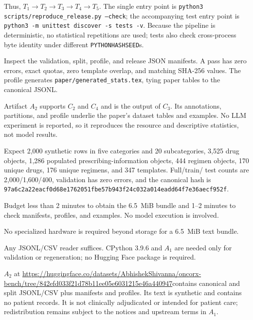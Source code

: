 \documentclass[conference]{IEEEtran}
\newcommand{\DatasetRevision}{\url{https://huggingface.co/datasets/AbhishekShivanna/oncorx-bench/tree/842efd033f21d78b11ee05e6031215e46a440947}}
\newcommand{\ReleaseHashA}{\texttt{97a6c2a22eacf0d68e1762051fbe57b9}}
\newcommand{\ReleaseHashB}{\texttt{43f24c032a014eadd64f7e36aecf952f}}
\begin{document}
Thus, $T_1\rightarrow T_2\rightarrow T_3\rightarrow T_4\rightarrow
T_5$.  The single entry point is
\texttt{python3 scripts/reproduce\_release.py --check}; the accompanying test
entry point is \texttt{python3 -m unittest discover -s tests -v}.  Because the
pipeline is deterministic, no statistical repetitions are used; tests also
check cross-process byte identity under different \texttt{PYTHONHASHSEED}s.

\artout

Inspect the validation, split, profile, and release JSON manifests.  A pass has
zero errors, exact quotas, zero template overlap, and matching SHA-256 values.
The profile generates \texttt{paper/generated\_stats.tex}, tying paper tables
to the canonical JSONL.

\newartifact

\artrel

Artifact $A_2$ supports $C_2$ and $C_4$ and is the output of $C_3$.  Its
annotations, partitions, and profile underlie the paper's dataset tables and
examples.  No LLM experiment is reported, so it reproduces the resource and
descriptive statistics, not model results.

\newpage
\artexp

Expect 2,000 synthetic rows in five categories and 20 subcategories, 3,525
drug objects, 1,286 populated prescribing-information objects, 444 regimen
objects, 170 unique drugs, 176 unique regimens, and 347 templates.  Full/train/
test counts are 2,000/1,600/400, validation has zero errors, and the canonical
hash is \ReleaseHashA\allowbreak\ReleaseHashB.

\arttime

Budget less than 2 minutes to obtain the 6.5~MiB bundle and 1--2 minutes to
check manifests, profiles, and examples.  No model execution is involved.

\artin


No specialized hardware is required beyond storage for a 6.5~MiB text bundle.


Any JSONL/CSV reader suffices.  CPython 3.9.6 and $A_1$ are needed only for
validation or regeneration; no Hugging Face package is required.


$A_2$ at \DatasetRevision contains canonical and split JSONL/CSV plus manifests
and profiles.  Its text is synthetic and contains no patient records.  It is
not clinically adjudicated or intended for patient care; redistribution
remains subject to the notices and upstream terms in $A_1$.
\end{document}
